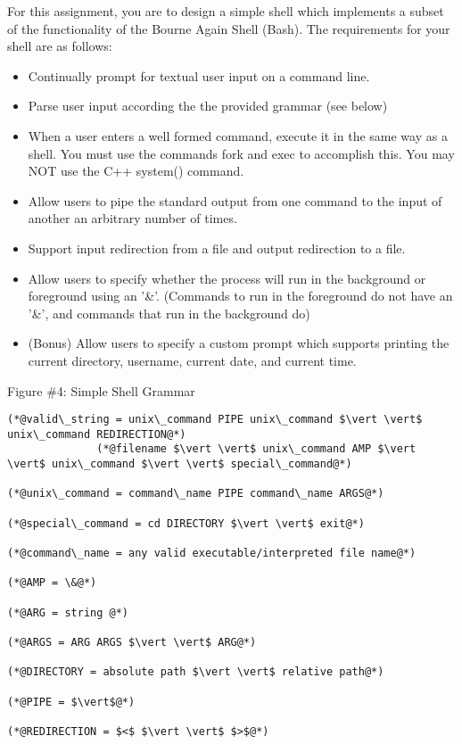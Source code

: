 \documentclass[12pt]{extarticle}
\newenvironment{myindentpar}[1]%
 {\begin{list}{}%
         {\setlength{\leftmargin}{#1}}%
         \item[]%
 }
 {\end{list}}
\begin{document}
\begin{myindentpar}{5mm}

For this assignment, you are to design a simple shell which implements a subset of the functionality of the Bourne Again Shell (Bash).  The requirements for your shell are as follows:

\begin{itemize}
    \setlength\itemsep{-0.1em}

    \item Continually prompt for textual user input on a command line.
    \item Parse user input according the the provided grammar (see below)
    \item When a user enters a well formed command, execute it in the same way as a shell.  You must use the commands fork and exec to accomplish this.  You may NOT use the C++ system() command.  
    \item Allow users to pipe the standard output from one command to the input of another an arbitrary number of times.  
    \item Support input redirection from a file and output redirection to a file.  
    \item Allow users to specify whether the process will run in the background or foreground using an '\&'.  (Commands to run in the foreground do not have an '\&', and commands that run in the background do)
    \item (Bonus) Allow users to specify a custom prompt which supports printing the current directory, username, current date, and current time.  

\end{itemize}

\begin{center}
    Figure \#4: Simple Shell Grammar
\end{center}
\begin{lstlisting}[frame=single]
(*@valid\_string = unix\_command PIPE unix\_command $\vert \vert$ unix\_command REDIRECTION@*)
              (*@filename $\vert \vert$ unix\_command AMP $\vert \vert$ unix\_command $\vert \vert$ special\_command@*)

(*@unix\_command = command\_name PIPE command\_name ARGS@*)

(*@special\_command = cd DIRECTORY $\vert \vert$ exit@*)

(*@command\_name = any valid executable/interpreted file name@*)

(*@AMP = \&@*)

(*@ARG = string @*)

(*@ARGS = ARG ARGS $\vert \vert$ ARG@*)

(*@DIRECTORY = absolute path $\vert \vert$ relative path@*)

(*@PIPE = $\vert$@*)

(*@REDIRECTION = $<$ $\vert \vert$ $>$@*)
\end{lstlisting}

\end{myindentpar}
\end{document}
